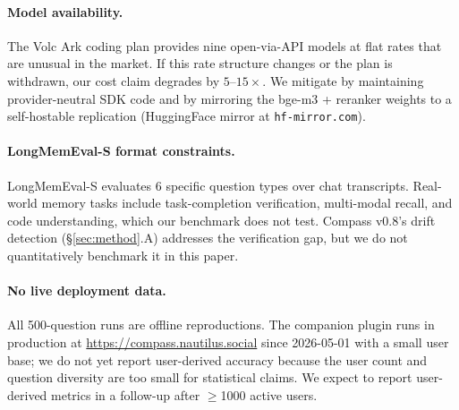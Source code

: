 \paragraph{Model availability.}
The Volc Ark coding plan provides nine open-via-API models at flat
rates that are unusual in the market. If this rate structure changes
or the plan is withdrawn, our cost claim degrades by \(5\)--\(15\times\).
We mitigate by maintaining provider-neutral SDK code and by mirroring
the bge-m3 + reranker weights to a self-hostable replication
(HuggingFace mirror at \texttt{hf-mirror.com}).

\paragraph{LongMemEval-S format constraints.}
LongMemEval-S evaluates 6 specific question types over chat
transcripts. Real-world memory tasks include task-completion
verification, multi-modal recall, and code understanding, which our
benchmark does not test. Compass v0.8's drift detection
(\S\ref{sec:method}.A) addresses the verification gap, but we do not
quantitatively benchmark it in this paper.

\paragraph{No live deployment data.}
All 500-question runs are offline reproductions. The companion plugin
runs in production at \url{https://compass.nautilus.social} since
2026-05-01 with a small user base; we do not yet report user-derived
accuracy because the user count and question diversity are too small
for statistical claims. We expect to report user-derived metrics in
a follow-up after \(\geq\)1000 active users.
